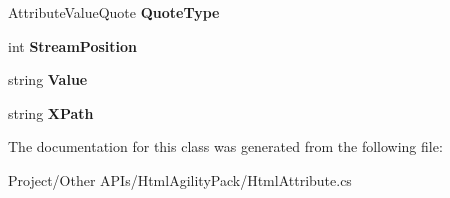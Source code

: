 \begin{DoxyCompactItemize}
Attribute\+Value\+Quote {\bfseries Quote\+Type}
\item 
\mbox{\label{class_html_agility_pack_1_1_html_attribute_a5f9c558a2ec9bba01ec5ae053bdae95b}} 
int {\bfseries Stream\+Position}
\item 
\mbox{\label{class_html_agility_pack_1_1_html_attribute_a48492beba1e60d7e756493d2b4a507c5}} 
string {\bfseries Value}
\item 
\mbox{\label{class_html_agility_pack_1_1_html_attribute_aba426abd7fa5b54ba4703ee570ab1479}} 
string {\bfseries X\+Path}
\end{DoxyCompactItemize}


The documentation for this class was generated from the following file\+:\begin{DoxyCompactItemize}
\item 
Project/\+Other A\+P\+Is/\+Html\+Agility\+Pack/Html\+Attribute.\+cs\end{DoxyCompactItemize}
